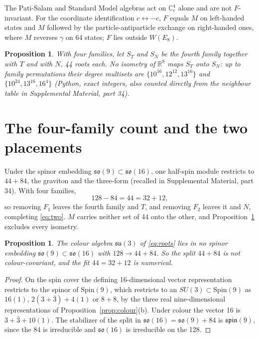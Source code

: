 \documentclass[aps,prd,reprint,onecolumn,nofootinbib,amsmath,amssymb,floatfix]{revtex4-2}
\theoremstyle{plain}
\newtheorem{proposition}[theorem]{Proposition}
\newcommand{\C}{\mathbb C}
\newcommand{\R}{\mathbb R}
\newcommand{\supp}[1]{Supplemental Material, part #1}
\begin{document}
The Pati-Salam and Standard Model algebras act on $\C^4_c$ alone and are not $F$-invariant. For the coordinate identification $c\leftrightarrow -c$, $F$ equals $M$ on left-handed states and $M$ followed by the particle-antiparticle exchange on right-handed ones, where $M$ reverses $\gamma$ on 64 states; $F$ lies outside $W(E_8)$.

\begin{proposition}\label{prop:44}
With four families, let $S_T$ and $S_N$ be the fourth family together with $T$ and with $N$, 44 roots each. No isometry of $\R^8$ maps $S_T$ onto $S_N$: up to family permutations their degree multisets are $\{10^{16},12^{12},13^{16}\}$ and $\{10^{24},13^{16},16^4\}$ (Python, exact integers, also counted directly from the neighbour table in \supp{34}).
\end{proposition}

\section{The four-family count and the two placements}\label{sec:44}

Under the spinor embedding $\mathfrak{so}(9)\subset\mathfrak{so}(16)$, one half-spin module restricts to $44+84$, the graviton and the three-form (recalled in \supp{34}). With four families,
\begin{equation}
128-84=44=32+12,
\end{equation}
so removing $F_1$ leaves the fourth family and $T$, and removing $F_2$ leaves it and $N$, completing \eqref{eq:two}. $M$ carries neither set of 44 onto the other, and Proposition~\ref{prop:44} excludes every isometry.

\begin{proposition}\label{prop:spin9}
The colour algebra $\mathfrak{su}(3)$ of \eqref{eq:roots} lies in no spinor embedding $\mathfrak{so}(9)\subset\mathfrak{so}(16)$ with $128\to44+84$. So the split $44+84$ is not colour-covariant, and the fit $44=32+12$ is numerical.
\end{proposition}

\begin{proof}
On the spin cover the defining 16-dimensional vector representation restricts to the spinor of $\mathrm{Spin}(9)$, which restricts to an $SU(3)\subset\mathrm{Spin}(9)$ as $16(1)$, $2(3+\bar3)+4(1)$ or $8+8$, by the three real nine-dimensional representations of Proposition~\ref{prop:colour}(b). Under colour the vector 16 is $3+\bar3+10(1)$. The stabilizer of the split in $\mathfrak{so}(16)=\mathfrak{so}(9)+84$ is $\mathfrak{spin}(9)$, since the 84 is irreducible and $\mathfrak{so}(16)$ is irreducible on the 128.
\end{proof}
\end{document}
